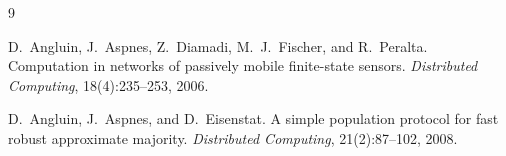 \documentclass[11pt,a4paper]{article}
\begin{document}
\begin{thebibliography}{9}

D.~Angluin, J.~Aspnes, Z.~Diamadi, M.~J.~Fischer, and R.~Peralta.
\newblock Computation in networks of passively mobile finite-state sensors.
\newblock \emph{Distributed Computing}, 18(4):235--253, 2006.

D.~Angluin, J.~Aspnes, and D.~Eisenstat.
\newblock A simple population protocol for fast robust approximate majority.
\newblock \emph{Distributed Computing}, 21(2):87--102, 2008.

\end{thebibliography}
\end{document}
